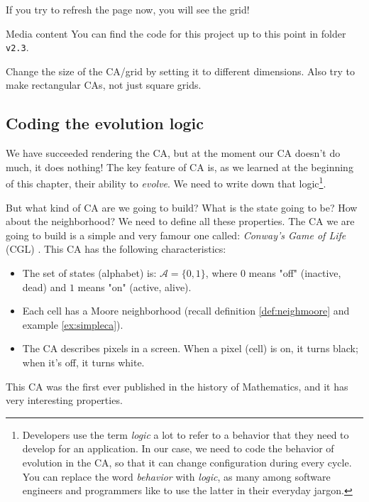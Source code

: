If you try to refresh the page now, you will see the grid!

\begin{trailer}{Media content}
You can find the code for this project up to this point in folder \texttt{v2.3}.
\end{trailer}

\begin{problem}
\label{prob:changecasize}
Change the size of the CA/grid by setting it to different dimensions. Also try to make rectangular CAs, not
just square grids.
\end{problem}

\subsection{Coding the evolution logic}
We have succeeded rendering the CA, but at the moment our CA doesn't do much, it does nothing!
The key feature of CA is, as we learned at the beginning of this chapter, their ability to
\textit{evolve}. We need to write down that
logic\footnote{Developers use the term \textit{logic} a lot to refer to a behavior that they need
to develop for an application. In our case, we need to code the behavior of evolution in the CA,
so that it can change configuration during every cycle. You can replace the word
\textit{behavior} with \textit{logic}, as many among software engineers and programmers like to
use the latter in their everyday jargon.}.

But what kind of CA are we going to build? What is the state going to be? How about the neighborhood? We
need to define all these properties. The CA we are going to build is a simple and very famour one called:
\textit{Conway's Game of Life} (CGL) \cite{wolfram-ca}.
This CA has the following characteristics:

\begin{itemize}
\item The set of states (alphabet) is: $\mathcal{A} = \{ 0, 1 \}$, where $0$ means "off" (inactive, dead) and
$1$ means "on" (active, alive).
\item Each cell has a Moore neighborhood (recall definition \ref{def:neighmoore} and example \ref{ex:simpleca}).
\item The CA describes pixels in a screen. When a pixel (cell) is on, it turns black; when it's off, it
turns white. 
\end{itemize}

This CA was the first ever published in the history of Mathematics, and it has very interesting properties.

